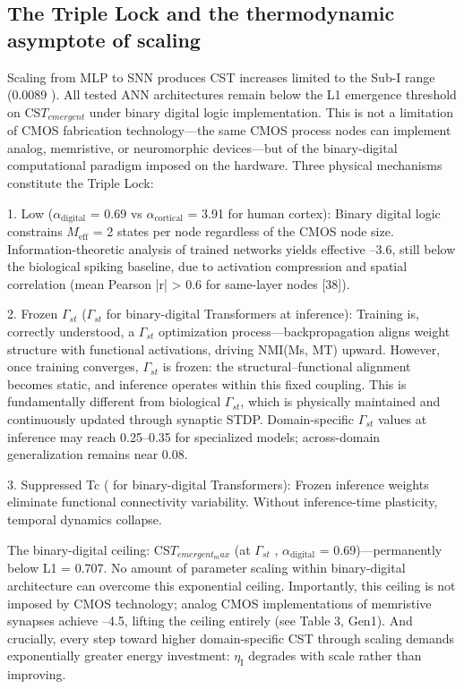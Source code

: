 \documentclass[a4paper,12pt]{article}
\begin{document}
\subsection{The Triple Lock and the thermodynamic asymptote of scaling}

Scaling from MLP to SNN produces CST increases limited to the Sub-I range (0.0089  ).
All tested ANN architectures remain below the L1 emergence threshold on CS$T_{emergent}$ under binary digital logic implementation.
This is not a limitation of CMOS fabrication technology---the same CMOS process nodes can implement analog, memristive, or neuromorphic devices---but of the binary-digital computational paradigm imposed on the hardware.
Three physical mechanisms constitute the Triple Lock:

1. Low  \alpha  ($\alpha_{\text{digital}}$ = 0.69 vs $\alpha_{\text{cortical}}$ = 3.91 for human cortex): Binary digital logic constrains $M_{\text{eff}}$ = 2 states per node regardless of the CMOS node size. Information-theoretic analysis of trained networks yields effective  \alpha   {}--3.6, still below the biological spiking baseline, due to activation compression and spatial correlation (mean Pearson |r| > 0.6 for same-layer nodes [38]).

2.
Frozen $\Gamma_{st}$ ($\Gamma_{st}$   for binary-digital Transformers at inference): Training is, correctly understood, a $\Gamma_{st}$ optimization process---backpropagation aligns weight structure with functional activations, driving NMI(Ms, MT) upward.
However, once training converges, $\Gamma_{st}$ is frozen: the structural--functional alignment becomes static, and inference operates within this fixed coupling.
This is fundamentally different from biological $\Gamma_{st}$, which is physically maintained and continuously updated through synaptic STDP.
Domain-specific $\Gamma_{st}$ values at inference may reach 0.25--0.35 for specialized models; across-domain generalization remains near 0.08.

3. Suppressed Tc ( \Psi   {} for binary-digital Transformers): Frozen inference weights eliminate functional connectivity variability. Without inference-time plasticity, temporal dynamics collapse.

The binary-digital ceiling: CS$T_{emergent_max}$   (at $\Gamma_{st}$  , $\alpha_{\text{digital}}$ = 0.69)---permanently below L1 = 0.707.
No amount of parameter scaling within binary-digital architecture can overcome this exponential ceiling.
Importantly, this ceiling is not imposed by CMOS technology; analog CMOS implementations of memristive synapses achieve  \alpha   {}--4.5, lifting the ceiling entirely (see Table 3, Gen1).
And crucially, every step toward higher domain-specific CST through scaling demands exponentially greater energy investment: $\eta_{\text{I}}$ degrades with scale rather than improving.
\end{document}

